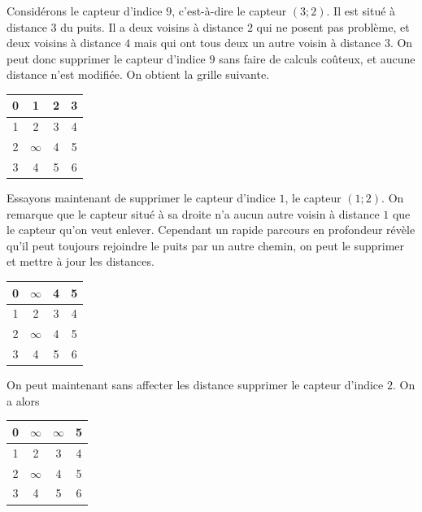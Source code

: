 \documentclass[12pt,a4paper]{article}
\begin{document}
Considérons le capteur d'indice $9$, c'est-à-dire le capteur $(3;2)$. Il est situé à distance $3$ du puits. Il a deux voisins à distance $2$ qui ne posent pas problème, et deux voisins à distance $4$ mais qui ont tous deux un autre voisin à distance $3$. On peut donc supprimer le capteur d'indice $9$ sans faire de calculs coûteux, et aucune distance n'est modifiée. On obtient la grille suivante.

\begin{center}
\begin{tabular}{|c|c|c|c|}
\hline 
0 & 1 & 2 & 3 \\ 
\hline 
1 & 2 & 3 & 4 \\ 
\hline 
2 & $\infty$ & 4 & 5 \\ 
\hline 
3 & 4 & 5 & 6 \\ 
\hline 
\end{tabular} 

\end{center}
Essayons maintenant de supprimer le capteur d'indice $1$, le capteur $(1;2)$. On remarque que le capteur situé à sa droite n'a aucun autre voisin à distance $1$ que le capteur qu'on veut enlever. Cependant un rapide parcours en profondeur révèle qu'il peut toujours rejoindre le puits par un autre chemin, on peut le supprimer et mettre à jour les distances.

\begin{center}
\begin{tabular}{|c|c|c|c|}
\hline 
0 & $\infty$ & 4 & 5 \\ 
\hline 
1 & 2 & 3 & 4 \\ 
\hline 
2 & $\infty$ & 4 & 5 \\ 
\hline 
3 & 4 & 5 & 6 \\ 
\hline 

\end{tabular} 
\end{center}

On peut maintenant sans affecter les distance supprimer le capteur d'indice $2$. On a alors

\begin{center}
\begin{tabular}{|c|c|c|c|}
\hline 
0 & $\infty$ & $\infty$ & 5 \\ 
\hline 
1 & 2 & 3 & 4 \\ 
\hline 
2 & $\infty$ & 4 & 5 \\ 
\hline 
3 & 4 & 5 & 6 \\ 
\hline 

\end{tabular} 
\end{center}
\end{document}
